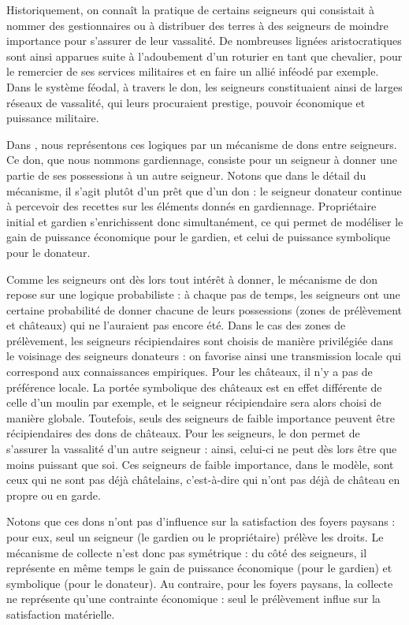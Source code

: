 Historiquement, on connaît la pratique de certains seigneurs qui consistait à nommer des gestionnaires ou à distribuer des terres à des seigneurs de moindre importance pour s'assurer de leur vassalité.
De nombreuses lignées aristocratiques sont ainsi apparues suite à l'adoubement d'un roturier en tant que chevalier, pour le remercier de ses services militaires et en faire un allié inféodé par exemple.
Dans le système féodal, à travers le don, les seigneurs constituaient ainsi de larges réseaux de vassalité, qui leurs procuraient prestige, pouvoir économique et puissance militaire.

\begin{tcolorbox}[breakable,left=0pt,right=0pt,top=0pt,bottom=0pt,
	colback=gray!15,colframe=gray!15,width=\dimexpr\textwidth\relax, 
	enlarge left by=0mm, boxsep=5pt,arc=0pt,outer arc=0pt, parbox=false]
	
	Dans \simfeodal{}, nous représentons ces logiques par un mécanisme de dons entre seigneurs.
	Ce don, que nous nommons \og gardiennage\fg{}, consiste pour un seigneur à donner une partie de ses possessions à un autre seigneur.
	Notons que dans le détail du mécanisme, il s'agit plutôt d'un prêt que d'un don : le seigneur donateur continue à percevoir des recettes sur les éléments donnés en gardiennage\footnotemark.
	Propriétaire initial et gardien s'enrichissent donc simultanément, ce qui permet de modéliser le gain de puissance économique pour le gardien, et celui de puissance symbolique pour le donateur.
	
	Comme les seigneurs ont dès lors tout intérêt à donner, le mécanisme de don repose sur une logique probabiliste : à chaque pas de temps, les seigneurs ont une certaine probabilité de donner chacune de leurs possessions (zones de prélèvement et châteaux) qui ne l'auraient pas encore été.
	Dans le cas des zones de prélèvement, les seigneurs récipiendaires sont choisis de manière privilégiée dans le voisinage des seigneurs donateurs : on favorise ainsi une transmission locale qui correspond aux connaissances empiriques.
	Pour les châteaux, il n'y a pas de préférence locale.
	La portée symbolique des châteaux est en effet différente de celle d'un moulin par exemple, et le seigneur récipiendaire sera alors choisi de manière globale.
	Toutefois, seuls des seigneurs de faible importance peuvent être récipiendaires des dons de châteaux.
	Pour les seigneurs, le don permet de s'assurer la vassalité d'un autre seigneur : ainsi, celui-ci ne peut dès lors être que moins puissant que soi.
	Ces seigneurs de faible importance, dans le modèle, sont ceux qui ne sont pas déjà châtelains, c'est-à-dire qui n'ont pas déjà de château en propre ou en garde.
	
	Notons que ces dons n'ont pas d'influence sur la satisfaction des foyers paysans : pour eux, seul un seigneur (le gardien ou le propriétaire) prélève les droits.
	Le mécanisme de collecte n'est donc pas symétrique : du côté des seigneurs, il représente en même temps le gain de puissance économique (pour le gardien) et symbolique (pour le donateur).
	Au contraire, pour les foyers paysans, la collecte ne représente qu'une contrainte économique : seul le prélèvement influe sur la satisfaction matérielle.
\end{tcolorbox}
